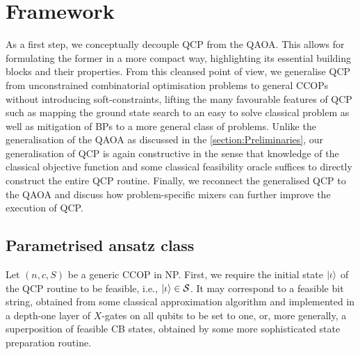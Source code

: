 \documentclass[10pt,conference]{IEEEtran}
\newcommand*{\solset}{S}              %
\newcommand*{\solspace}{\mathcal{S}}  %
\begin{document}
\section{\label{section:Framework}Framework}

As a first step, we conceptually decouple QCP from the QAOA.
This allows for formulating the former in a more compact way, highlighting its essential building blocks and their properties.
From this cleansed point of view, we generalise QCP from unconstrained combinatorial optimisation problems to general CCOPs without introducing soft-constraints, lifting the many favourable features of QCP such as mapping the ground state search to an easy to solve classical problem as well as mitigation of BPs to a more general class of problems.
Unlike the generalisation of the QAOA as discussed in the \autoref{section:Preliminaries}, our generalisation of QCP is again constructive in the sense that knowledge of the classical objective function and some classical feasibility oracle suffices to directly construct the entire QCP routine.
Finally, we reconnect the generalised QCP to the QAOA and discuss how problem-specific mixers can further improve the execution of QCP.


\subsection{\label{subsection:ParameterisedAnsatzClass}Parametrised ansatz class}

Let $(n, c, \solset)$ be a generic CCOP in NP.
First, we require the initial state $\ket{\iota}$ of the QCP routine to be feasible, i.e., $\ket{\iota} \in \solspace$.
It may correspond to a feasible bit string, obtained from some classical approximation algorithm and implemented in a depth-one layer of $X$-gates on all qubits to be set to one, or, more generally, a superposition of feasible CB states, obtained by some more sophisticated state preparation routine.
\end{document}
